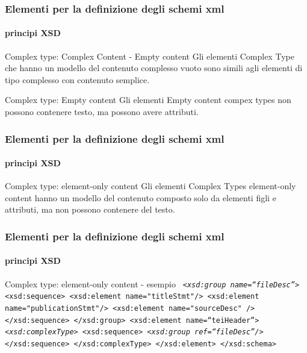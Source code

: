 \begin{frame}
	\frametitle{Elementi per la definizione degli schemi xml}
	\framesubtitle{principi XSD}
	\addtocounter{nframe}{1}

	\begin{block}{Complex type: Complex Content - Empty content}
		Gli elementi Complex Type che hanno un modello del contenuto complesso vuoto sono simili agli elementi di tipo complesso con contenuto semplice.
	\end{block}

	\begin{block}{Complex type: Empty content}
		Gli elementi Empty content compex types non possono contenere testo, ma possono avere attributi.
	\end{block}
\end{frame}



\begin{frame}
	\frametitle{Elementi per la definizione degli schemi xml}
	\framesubtitle{principi XSD}
	\addtocounter{nframe}{1}

	\begin{block}{Complex type: element-only content}
		Gli elementi  Complex Types element-only content hanno un modello del contenuto composto solo da elementi figli e attributi, ma non possono contenere del testo.
	\end{block}
\end{frame}

\begin{frame}
	\frametitle{Elementi per la definizione degli schemi xml}
	\framesubtitle{principi XSD}
	\addtocounter{nframe}{1}

	\begin{block}{Complex type: element-only content - esempio}
		\texttt{
			\emph{<xsd:group name=``fileDesc''>}
			<xsd:sequence>
			<xsd:element name="titleStmt"/>
			<xsd:element name="publicationStmt"/>
			<xsd:element name="sourceDesc" />
			</xsd:sequence>
			</xsd:group>
			<xsd:element name=``teiHeader''>
			\emph{<xsd:complexType>}
			<xsd:sequence>
			\emph{<xsd:group ref=``fileDesc''/>}
			</xsd:sequence>
			</xsd:complexType>
			</xsd:element>
			</xsd:schema>
		}
	\end{block}
\end{frame}

